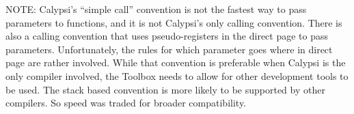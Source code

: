 NOTE: Calypsi's ``simple call'' convention is not the fastest way to pass parameters to functions, and it is not Calypsi's only calling convention.
There is also a calling convention that uses pseudo-registers in the direct page to pass parameters.
Unfortunately, the rules for which parameter goes where in direct page are rather involved.
While that convention is preferable when Calypsi is the only compiler involved, the Toolbox needs to allow for other development tools to be used.
The stack based convention is more likely to be supported by other compilers. So speed was traded for broader compatibility.







